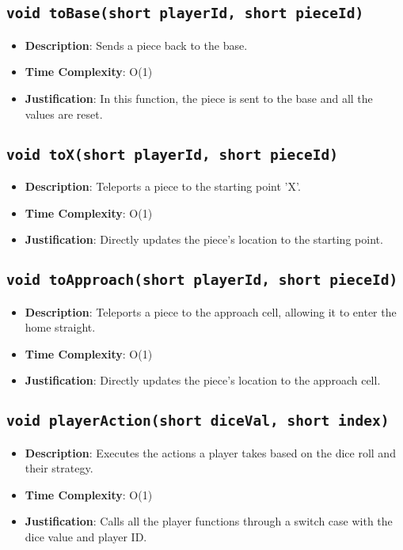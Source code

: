 \documentclass{article}
\begin{document}
\subsection{\texttt{void toBase(short playerId, short pieceId)}}
\begin{itemize}
    \item \textbf{Description}: Sends a piece back to the base.
    \item \textbf{Time Complexity}: O(1)
    \item \textbf{Justification}: In this function, the piece is sent to the base and all the values are reset.
\end{itemize}

\subsection{\texttt{void toX(short playerId, short pieceId)}}
\begin{itemize}
    \item \textbf{Description}: Teleports a piece to the starting point 'X'.
    \item \textbf{Time Complexity}: O(1)
    \item \textbf{Justification}: Directly updates the piece’s location to the starting point.
\end{itemize}

\subsection{\texttt{void toApproach(short playerId, short pieceId)}}
\begin{itemize}
    \item \textbf{Description}: Teleports a piece to the approach cell, allowing it to enter the home straight.
    \item \textbf{Time Complexity}: O(1)
    \item \textbf{Justification}: Directly updates the piece’s location to the approach cell.
\end{itemize}

\subsection{\texttt{void playerAction(short diceVal, short index)}}
\begin{itemize}
    \item \textbf{Description}: Executes the actions a player takes based on the dice roll and their strategy.
    \item \textbf{Time Complexity}: O(1)
    \item \textbf{Justification}: Calls all the player functions through a switch case with the dice value and player ID.
\end{itemize}
\end{document}
